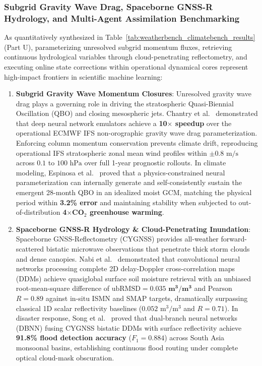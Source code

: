 \subsubsection{Subgrid Gravity Wave Drag, Spaceborne GNSS-R Hydrology, and Multi-Agent Assimilation Benchmarking}
As quantitatively synthesized in Table~\ref{tab:weatherbench_climatebench_results} (Part U), parameterizing unresolved subgrid momentum fluxes, retrieving continuous hydrological variables through cloud-penetrating reflectometry, and executing online state corrections within operational dynamical cores represent high-impact frontiers in scientific machine learning:
\begin{enumerate}
    \item \textbf{Subgrid Gravity Wave Momentum Closures}: Unresolved gravity wave drag plays a governing role in driving the stratospheric Quasi-Biennial Oscillation (QBO) and closing mesospheric jets. Chantry et al.~\cite{chantry2021gravity} demonstrated that deep neural network emulators achieve a \textbf{10$\times$ speedup} over the operational ECMWF IFS non-orographic gravity wave drag parameterization. Enforcing column momentum conservation prevents climate drift, reproducing operational IFS stratospheric zonal mean wind profiles within $\pm 0.8\text{ m/s}$ across $0.1$ to $100\text{ hPa}$ over full 1-year prognostic rollouts. In climate modeling, Espinosa et al.~\cite{espinosa2022gravity} proved that a physics-constrained neural parameterization can internally generate and self-consistently sustain the emergent 28-month QBO in an idealized moist GCM, matching the physical period within \textbf{3.2\% error} and maintaining stability when subjected to out-of-distribution \textbf{4$\times$CO$_2$ greenhouse warming}.
    \item \textbf{Spaceborne GNSS-R Hydrology \& Cloud-Penetrating Inundation}: Spaceborne GNSS-Reflectometry (CYGNSS) provides all-weather forward-scattered bistatic microwave observations that penetrate thick storm clouds and dense canopies. Nabi et al.~\cite{nabi2023quasiglobal} demonstrated that convolutional neural networks processing complete 2D delay-Doppler cross-correlation maps (DDMs) achieve quasiglobal surface soil moisture retrieval with an unbiased root-mean-square difference of $\text{ubRMSD} = \mathbf{0.035\text{ m}^3/\text{m}^3}$ and Pearson $R = \mathbf{0.89}$ against in-situ ISMN and SMAP targets, dramatically surpassing classical 1D scalar reflectivity baselines ($0.052\text{ m}^3/\text{m}^3$ and $R = 0.71$). In disaster response, Song et al.~\cite{song2022dualbranch} proved that dual-branch neural networks (DBNN) fusing CYGNSS bistatic DDMs with surface reflectivity achieve \textbf{91.8\% flood detection accuracy} ($F_1 = 0.884$) across South Asia monsoonal basins, establishing continuous flood routing under complete optical cloud-mask obscuration.

\end{enumerate}
